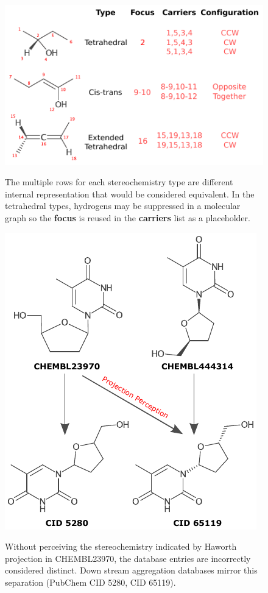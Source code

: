 \documentclass[doublespacing]{bmcart}
\begin{document}
\begin{backmatter}
\begin{figure}[h!]
  \caption{ 
  The multiple rows for each
  stereochemistry type are different internal representation that
  would be considered equivalent. In the tetrahedral types,
  hydrogens may be suppressed in a molecular graph so the
  \textbf{focus} is reused in the \textbf{carriers} list as a
  placeholder.}
\centering
\includegraphics{img/stereodesc_annotated.pdf}
\label{fig:stereodatastructure}
\end{figure}




\begin{figure}[h!]
  \caption{
    Without perceiving the stereochemistry indicated by Haworth
    projection in CHEMBL23970, the database entries are incorrectly
    considered distinct. Down stream aggregation databases mirror this
    separation (PubChem CID 5280, CID 65119).}
    \centering
    \includegraphics{img/projections_annotated.pdf}
    \label{fig:stereoprojections}
\end{figure}


\end{backmatter}
\end{document}
